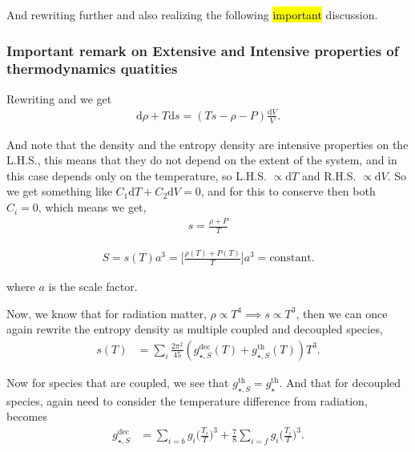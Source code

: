 \documentclass[a4paper, 12pt]{article}
\begin{document}
{{        And rewriting further and also realizing the following
        \hl{important} discussion. 
        \subsubsection{Important remark on Extensive and
        Intensive properties of thermodynamics quatities}%
          \label{sub:Important remark on Extensive and
                Intensive properties of thermodynamics quatities}
      
        Rewriting and we get 
        \begin{align}
          \label{2.24}
          \mathrm{d} \rho + T \mathrm{d}s = (Ts - \rho - P)
          \frac{\mathrm{d}V}{V}.
        \end{align}
        
        And note that the density and the entropy density are
        intensive properties on the \textnormal{L.H.S.}, this
        means that they do not depend on the extent of the system,
        and in this case depends only on the temperature, so
        \textnormal{L.H.S.} \( \propto \mathrm{d}T \) and
        \textnormal{R.H.S.} \( \propto \mathrm{d}V \). So we get
        something like \( C_1 \mathrm{d}T + C_2 \mathrm{d}V = 0  \),
        and for this to conserve then both \( C_i = 0 \), which
        means we get, 
        \begin{align}
          \label{entropy density}
          s = \frac{\rho + P}{T}
        \end{align}

       \begin{align}
        \label{entropy constant}
         S = s(T) a^3 = \bigg[ \frac{\rho(T) + P(T)}{T} \bigg] a^3
         = \mathrm{constant}.
       \end{align} 

       where \( a \) is the scale factor.
      
      Now, we know that for radiation matter, \( \rho \propto T^4
      \implies s \propto T^3 \), then we can once again rewrite the
      entropy density as multiple coupled and decoupled species, 
      \begin{align}
        \label{entropy density in coupled decoupled}
        s(T) &= \sum_i \frac{2\pi^2}{45}( g_{\star,
        S}^{\mathrm{dec}}(T) + g_{\star, S}^{\mathrm{th}}(T) )T^3. 
      \end{align}
    
    Now for species that are coupled, we see that \( g_{\star,
    S}^{\mathrm{th}} = g_{\star}^{\mathrm{th}}. \) And that for
    decoupled species, again need to consider the temperature
    difference from radiation, becomes 
    \begin{align}
      \label{eof for decoupled}
      g_{\star, S}^{\mathrm{dec}} &=  \sum_{i = b} g_i \bigg(
      \frac{T_i}{T} \bigg)^3 + \frac{7}{8} \sum_{i = f} g_i \bigg(
      \frac{T_i}{T}\bigg)^3.
    \end{align}

}}
\end{document}
